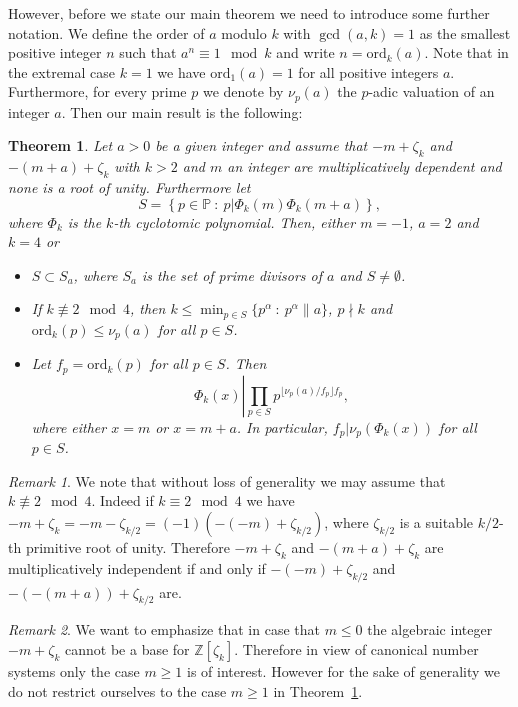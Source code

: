 \documentclass{amsart}
\theoremstyle{plain}
\numberwithin{equation}{section}
\newtheorem{theorem}[thm]{Theorem}
\theoremstyle{remark}
\newtheorem{remark}{Remark}
\begin{document}
However, before we state our main theorem we need to introduce some
further notation. We define the order of $a$ modulo $k$ with
$\gcd(a,k)=1$ as the smallest positive integer $n$ such that
$a^n\equiv 1 \mod k$ and write $n={\mathrm{ord}}_k(a)$. Note that in the
extremal case $k=1$ we have ${\mathrm{ord}}_1(a)=1$ for all positive integers
$a$. Furthermore, for every prime $p$ we denote by $\nu_p(a)$ the
$p$-adic valuation of an integer $a$. Then our main result is the
following:

\begin{theorem}\label{th:mult_ind}
  Let $a>0$ be a given integer and assume that $-m+\zeta_k$ and
  $-(m+a)+\zeta_k$ with $k>2$ and $m$ an integer are multiplicatively
  dependent and none is a root of unity. Furthermore let
  \[S=\left\{p\in{{\mathbb P}}\: :\: p|\Phi_k(m)\Phi_k(m+a)\right\},\]
  where $\Phi_k$ is the $k$-th cyclotomic polynomial.
  Then, either $m=-1$, $a=2$ and $k=4$ or 
\begin{itemize}
 \item $S\subset S_a$, where $S_a$ is the set of prime divisors of $a$ and $S\neq \emptyset$.
 \item If $k\not\equiv 2 \mod 4$, then $k\leq \min_{p\in S}
   \{p^\alpha\: :\:p^\alpha \| a\}$, $p\nmid k$ and ${\mathrm{ord}}_k(p)\leq
   \nu_p(a)$ for all $p\in S$.
 \item Let $f_p={\mathrm{ord}}_{k}(p)$ for all $p\in S$. Then
   \[\Phi_k(x) \left| \prod_{p\in S} p^{\lfloor \nu_p(a)/f_p \rfloor f_p}\right. ,\]
   where either $x=m$ or $x=m+a$. In particular,
   $f_p|\nu_p(\Phi_k(x))$ for all $p\in S$.
\end{itemize}
\end{theorem}

\begin{remark}\label{rem:k_not_2}
  We note that without loss of generality we may assume that
  $k\not\equiv 2 \mod 4$. Indeed if $k\equiv 2 \mod 4$ we have
  $-m+\zeta_k=-m-\zeta_{k/2}=(-1)(-(-m)+\zeta_{k/2})$, where
  $\zeta_{k/2}$ is a suitable $k/2$-th primitive root of
  unity. Therefore $-m+\zeta_k$ and $-(m+a)+\zeta_k$ are
  multiplicatively independent if and only if $-(-m)+\zeta_{k/2}$ and
  $-(-(m+a))+\zeta_{k/2}$ are.
\end{remark}

\begin{remark}
We want to emphasize that in case that $m\leq0$ the algebraic integer $-m+\zeta_k$ cannot be a base for ${{\mathbb Z}}[\zeta_k]$.
Therefore in view of canonical number systems only the case $m\geq1$ is of interest. However for the sake of generality
we do not restrict ourselves to the case $m\geq1$ in Theorem~\ref{th:mult_ind}.
\end{remark}
\end{document}
